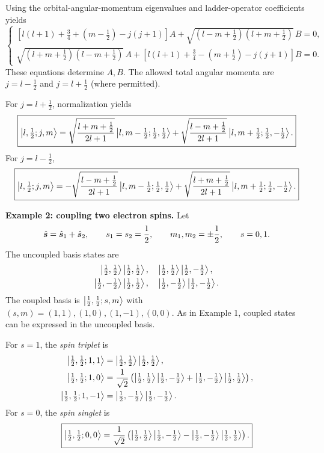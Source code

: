 Using the orbital-angular-momentum eigenvalues and ladder-operator coefficients yields
\begin{equation}
\begin{cases}
\displaystyle\left[l(l+1)+\frac34+\left(m-\frac12\right)-j(j+1)\right]A
+\sqrt{\left(l-m+\frac12\right)\left(l+m+\frac12\right)}\,B=0,\\[1.1ex]
\displaystyle\sqrt{\left(l+m+\frac12\right)\left(l-m+\frac12\right)}\,A
+\left[l(l+1)+\frac34-\left(m+\frac12\right)-j(j+1)\right]B=0.
\end{cases}
\end{equation}
These equations determine $A,B$. The allowed total angular momenta are $j=l-\frac12$ and $j=l+\frac12$ (where permitted).

For $j=l+\frac12$, normalization yields
\begin{equation}
\boxed{\left|l,\tfrac12;j,m\right\rangle
=\sqrt{\frac{l+m+\frac12}{2l+1}}\left|l,m-\tfrac12;\tfrac12,\tfrac12\right\rangle
+\sqrt{\frac{l-m+\frac12}{2l+1}}\left|l,m+\tfrac12;\tfrac12,-\tfrac12\right\rangle.}
\end{equation}
For $j=l-\frac12$,
\begin{equation}
\boxed{\left|l,\tfrac12;j,m\right\rangle
=-\sqrt{\frac{l-m+\frac12}{2l+1}}\left|l,m-\tfrac12;\tfrac12,\tfrac12\right\rangle
+\sqrt{\frac{l+m+\frac12}{2l+1}}\left|l,m+\tfrac12;\tfrac12,-\tfrac12\right\rangle.}
\end{equation}

\textbf{Example 2: coupling two electron spins.} Let
\begin{equation}
\hat{\bm{s}}=\hat{\bm{s}}_1+\hat{\bm{s}}_2,\qquad
s_1=s_2=\frac12,\qquad m_1,m_2=\pm\frac12,\qquad s=0,1.
\end{equation}
The uncoupled basis states are
\begin{equation}
\begin{gathered}
\left|\tfrac12,\tfrac12\right\rangle\left|\tfrac12,\tfrac12\right\rangle,\quad
\left|\tfrac12,\tfrac12\right\rangle\left|\tfrac12,-\tfrac12\right\rangle,\\
\left|\tfrac12,-\tfrac12\right\rangle\left|\tfrac12,\tfrac12\right\rangle,\quad
\left|\tfrac12,-\tfrac12\right\rangle\left|\tfrac12,-\tfrac12\right\rangle.
\end{gathered}
\end{equation}
The coupled basis is $\left|\tfrac12,\tfrac12;s,m\right\rangle$ with $(s,m)=(1,1),(1,0),(1,-1),(0,0)$. As in Example 1, coupled states can be expressed in the uncoupled basis.

For $s=1$, the \emph{spin triplet} is
\begin{equation}\begin{aligned}
\left|\tfrac12,\tfrac12;1,1\right\rangle
&=\left|\tfrac12,\tfrac12\right\rangle\left|\tfrac12,\tfrac12\right\rangle,\\
\left|\tfrac12,\tfrac12;1,0\right\rangle
&=\frac1{\sqrt2}\left(\left|\tfrac12,\tfrac12\right\rangle\left|\tfrac12,-\tfrac12\right\rangle
+\left|\tfrac12,-\tfrac12\right\rangle\left|\tfrac12,\tfrac12\right\rangle\right),\\
\left|\tfrac12,\tfrac12;1,-1\right\rangle
&=\left|\tfrac12,-\tfrac12\right\rangle\left|\tfrac12,-\tfrac12\right\rangle.
\end{aligned}\end{equation}
For $s=0$, the \emph{spin singlet} is
\begin{equation}
\boxed{\left|\tfrac12,\tfrac12;0,0\right\rangle
=\frac1{\sqrt2}\left(\left|\tfrac12,\tfrac12\right\rangle\left|\tfrac12,-\tfrac12\right\rangle
-\left|\tfrac12,-\tfrac12\right\rangle\left|\tfrac12,\tfrac12\right\rangle\right).}
\end{equation}